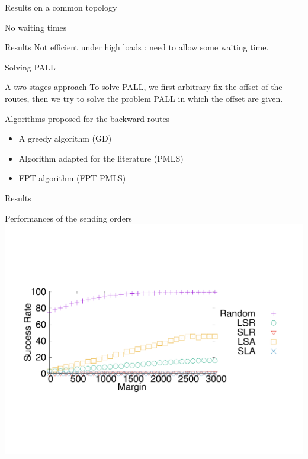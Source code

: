 \documentclass[10 pt]{beamer}
\begin{document}
\begin{section}{Results on a common topology}
\begin{subsection}{No waiting times}
\begin{frame}{Results}
  Not efficient under high loads : need to allow some waiting time.
\end{frame}
\end{subsection}

\begin{subsection}{Solving PALL}
\begin{frame}{A two stages approach}
To solve PALL, we first arbitrary fix the offset of the routes, then we try to solve the problem PALL in which the offset are given.

Algorithms proposed for the backward routes
\begin{itemize}
	
	 \item A greedy algorithm (GD)
	 \item Algorithm adapted for the literature (PMLS)
	 \item FPT algorithm (FPT-PMLS)
	\end{itemize}


\end{frame}
\end{subsection}

\begin{subsection}{Results}
\begin{frame}{Performances of the sending orders}
\centering
  \includegraphics[scale=0.5]{departs_gp_21000.pdf}\\
  

\end{frame}
\end{subsection}
\end{section}
\end{document}

